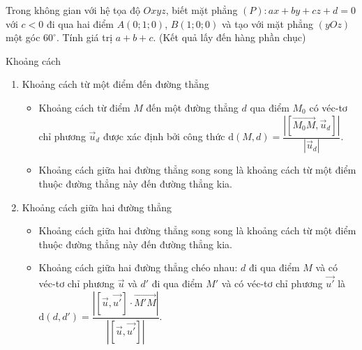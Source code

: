 \begin{ex}%
	Trong không gian với hệ tọa độ $Oxyz$, biết mặt phẳng $(P)\colon ax+by+cz+d=0$ với $c<0$ đi qua hai điểm $A(0;1;0)$, $B(1;0;0)$ và tạo với mặt phẳng $(yOz)$ một góc $60^\circ $. Tính giá trị $a+b+c$. (Kết quả lấy đến hàng phần chục)
\end{ex}
\begin{dang}{Khoảng cách}
	\begin{enumerate}
		\item Khoảng cách từ một điểm đến đường thẳng
		\begin{itemize}
			\item Khoảng cách từ điểm $M$ đến một đường thẳng $d$ qua điểm $M_{0}$ có véc-tơ chỉ phương $\overrightarrow{u}_d$ được xác định bởi công thức $\mathrm{d}(M, d)=\dfrac{\left|\left[\overrightarrow{M_0 M}, \vec{u}_d\right]\right|}{\left|\vec{u}_d\right|}$.
			\item Khoảng cách giữa hai đường thẳng song song là khoảng cách từ một điểm thuộc đường thẳng này đến đường thẳng kia.
		\end{itemize}
		\item Khoảng cách giữa hai đường thẳng
		\begin{itemize}
			\item Khoảng cách giữa hai đường thẳng song song là khoảng cách từ một điểm thuộc đường thẳng này đến đường thẳng kia.
			\item Khoảng cách giữa hai đường thẳng chéo nhau: $d$ đi qua điểm $M$ và có véc-tơ chỉ phương $\overrightarrow{u}$ và $d'$ đi qua điểm $M'$ và có véc-tơ chỉ phương $\overrightarrow{u'}$ là $\mathrm{d}\left(d, d'\right)=\dfrac{\left|\left[\vec{u}, \vec{u'}\right] \cdot \overrightarrow{M'M}\right|}{\left|\left[\vec{u}, \vec{u'}\right]\right|}$.
		\end{itemize}
	\end{enumerate}
\end{dang}
